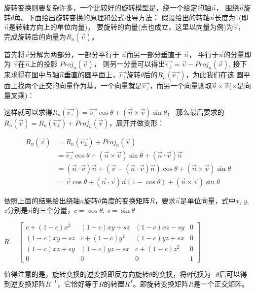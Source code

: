 \documentclass[UTF8]{ctexart}
\begin{document}
旋转变换则要复杂许多，一个比较好的旋转模型是，绕一个给定的轴$\vec n$，
围绕$\vec n$旋转$\theta$角。下面给出旋转变换的原理和公式推导方法：
假设给出的转轴$\vec n$长度为1(即$\vec n$是转轴方向上的单位向量)，
要旋转的向量(点也成立，这里以向量为例)为$\vec v$，
完成旋转后的向量为$R_n(\vec v)$。

首先将$\vec v$分解为两部分，一部分平行于
$\vec n$而另一部分垂直于
$\vec n$，
平行于$\vec n$的分量即为
$\vec v$在$\vec n$上的投影
$Proj_n(\vec v)$，
则另一分量可以得出$\vec{v_{\perp}} = \vec{v} - Proj_n(\vec v)$,
接下来求得在图中与轴$\vec n$垂直的圆平面上，$\vec{v_{\perp}}$旋转$\theta$后的$R_n(\vec{v_{\perp}})$，为此我们在该
圆平面上找两个正交的向量作为基，一个向量就是$\vec{v_{\perp}}$，而另一个向量则取$\vec n \times \vec v$($\times$是向量叉乘)：

这样就可以求得$R_n(\vec{v_{\perp}}) = \vec{v_{\perp}} \cos\theta + (\vec n \times \vec v) \sin\theta$，
那么最后要求的$R_n(\vec v) = R_n(\vec{v_{\perp}}) + Proj_n(\vec v)$，展开并做变形：

\begin{align}
R_n(\vec v)  &= R_n(\vec{v_{\perp}}) + Proj_n(\vec v) \\
    &= \vec{v_{\perp}}\cos\theta + (\vec n \times \vec v) \sin\theta + (\vec n \cdot \vec v)\vec n \\
    &= (\vec n \cdot \vec v)\vec n + (\vec v - (\vec n \cdot \vec v)\vec n)\cos\theta + (\vec n \times \vec v)\sin\theta \\
    &= \vec{v} \cos\theta + (\vec n \cdot \vec v)\vec{n}(1-\cos\theta) + (\vec n \times \vec v)\sin \theta 
\end{align}

依照上面的结果给出绕轴$n$旋转$\theta$角度的变换矩阵$R$，要求$\vec n$是单位向量，式中$x$, $y$, $z$分别是$\vec n$的三个分量，$c = \cos\theta$, $s = \sin\theta$

$R = \begin{bmatrix}
    c+(1-c)x^2 & (1-c)xy+sz & (1-c)xz-sy & 0 \\ 
    (1-c)xy-sz & c+(1-c)y^2 & (1-c)yz+sx & 0\\ 
    (1-c)xz+sy & (1-c)yz-sx & c+(1-c)z^2 & 0\\ 
    0 & 0 & 0 & 1 
    \end{bmatrix} $

值得注意的是，旋转变换的逆变换即反方向旋转$\theta$的变换，将$\theta$代换为$-\theta$后可以得到逆变换矩阵$R^{-1}$，它恰好等于$R$的转置$R^T$。即旋转变换矩阵$R$是一个正交矩阵。

\newpage
\end{document}
